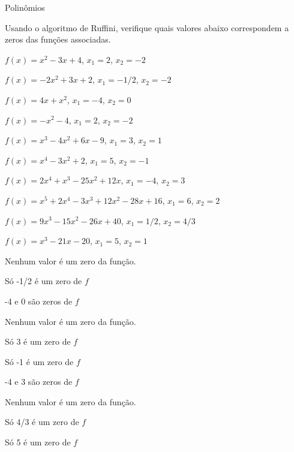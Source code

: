 \begin{exercicios}{Polinômios}
    \begin{exercicio}
        Usando o algoritmo de Ruffini, verifique quais valores abaixo correspondem a zeros das funções associadas.
        \begin{alphalist}
            \item $f(x) = x^2 - 3x + 4$,                         $x_1 = 2$,    $x_2 = -2$
            \item $f(x) = -2x^2 + 3x + 2$,                       $x_1 = -1/2$, $x_2 = -2$
            \item $f(x) = 4x + x^2 $,                            $x_1 = -4$,   $x_2 = 0$
            \item $f(x) = -x^2 - 4$,                             $x_1 = 2$,    $x_2 = -2$
            \item $f(x) = x^3 - 4x^2 + 6x - 9$,                  $x_1 = 3$,    $x_2 = 1$
            \item $f(x) = x^4 - 3x^2 + 2$,                       $x_1 = 5$,    $x_2 = -1$
            \item $f(x) = 2x^4 + x^3 - 25x^2 + 12x$,             $x_1 = -4$,   $x_2 = 3$
            \item $f(x) = x^5 + 2x^4 - 3x^3 + 12x^2 - 28x + 16$, $x_1 = 6$,    $x_2 = 2$
            \item $f(x) = 9x^3 - 15x^2 - 26x + 40$,              $x_1 = 1/2$,  $x_2 = 4/3$
            \item $f(x) = x^3 - 21x - 20$,                       $x_1 = 5$,    $x_2 = 1$
        \end{alphalist}
        \begin{answers}
            \begin{alphalist}
                \item Nenhum valor é um zero da função.
                \item Só -1/2 é um zero de $f$
                \item -4 e 0 são zeros de $f$
                \item Nenhum valor é um zero da função.
                \item Só 3 é um zero de $f$
                \item Só -1 é um zero de $f$
                \item -4 e 3 são zeros de $f$
                \item Nenhum valor é um zero da função.
                \item Só 4/3 é um zero de $f$
                \item Só 5 é um zero de $f$
            \end{alphalist}
        \end{answers}
    \end{exercicio}
       

\end{exercicios}
